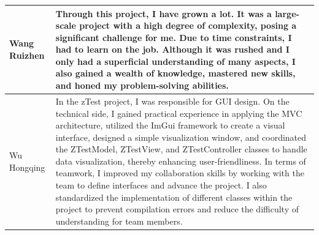\documentclass{article}
\begin{document}
\begin{tabular}{|p{50pt}|p{350pt}|}
    Wang Ruizhen   & Through this project, I have grown a lot. It was a large-scale project with a high degree of complexity, posing a significant challenge for me. Due to time constraints, I had to learn on the job. Although it was rushed and I only had a superficial understanding of many aspects, I also gained a wealth of knowledge, mastered new skills, and honed my problem-solving abilities.                                                                                                                                                                                                                                                                                                                                                                                                                                                                                                                                                                                                                                                                                                                                                                                                                                     \\ \hline
    Wu Hongqing    & In the zTest project, I was responsible for GUI design. On the technical side, I gained practical experience in applying the MVC architecture, utilized the ImGui framework to create a visual interface, designed a simple visualization window, and coordinated the ZTestModel, ZTestView, and ZTestController classes to handle data visualization, thereby enhancing user-friendliness. In terms of teamwork, I improved my collaboration skills by working with the team to define interfaces and advance the project. I also standardized the implementation of different classes within the project to prevent compilation errors and reduce the difficulty of understanding for team members.                                                                                                                                                                                                                                                                                                                                                                                                                                                                                                                        \\ \hline
\end{tabular}
\end{document}

